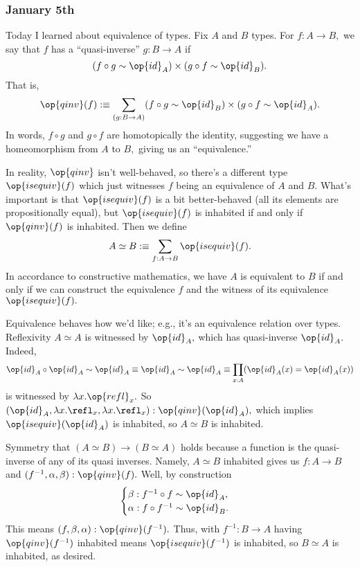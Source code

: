\subsubsection{January 5th}
Today I learned about equivalence of types. Fix $A$ and $B$ types. For $f:A\to B,$ we say that $f$ has a ``quasi-inverse'' $g:B\to A$ if
\[(f\circ g\sim\op{id}_A)\times(g\circ f\sim\op{id}_B).\]
That is,
\[\op{qinv}(f):\equiv\sum_{(g:B\to A)}(f\circ g\sim\op{id}_B)\times(g\circ f\sim\op{id}_A).\]
In words, $f\circ g$ and $g\circ f$ are homotopically the identity, suggesting we have a homeomorphism from $A$ to $B,$ giving us an ``equivalence.''

In reality, $\op{qinv}$ isn't well-behaved, so there's a different type $\op{isequiv}(f)$ which just witnesses $f$ being an equivalence of $A$ and $B.$ What's important is that $\op{isequiv}(f)$ is a bit better-behaved (all its elements are propositionally equal), but $\op{isequiv}(f)$ is inhabited if and only if $\op{qinv}(f)$ is inhabited. Then we define
\[A\simeq B:\equiv\sum_{f:A\to B}\op{isequiv}(f).\]
In accordance to constructive mathematics, we have $A$ is equivalent to $B$ if and only if we can construct the equivalence $f$ and the witness of its equivalence $\op{isequiv}(f).$

Equivalence behaves how we'd like; e.g., it's an equivalence relation over types. Reflexivity $A\simeq A$ is witnessed by $\op{id}_A,$ which has quasi-inverse $\op{id}_A.$ Indeed,
\[\op{id}_A\circ\op{id}_A\sim\op{id}_A\equiv\op{id}_A\sim\op{id}_A\equiv\prod_{x:A}(\op{id}_A(x)=\op{id}_A(x))\]
is witnessed by $\lambda x.\op{refl}_x.$ So $(\op{id}_A,\lambda x.\refl_x,\lambda x.\refl_x):\op{qinv}(\op{id}_A),$ which implies $\op{isequiv}(\op{id}_A)$ is inhabited, so $A\simeq B$ is inhabited.

Symmetry that $(A\simeq B)\to(B\simeq A)$ holds because a function is the quasi-inverse of any of its quasi inverses. Namely, $A\simeq B$ inhabited gives us $f:A\to B$ and $(f^{-1},\alpha,\beta):\op{qinv}(f).$ Well, by construction
\[\begin{cases}
    \beta:f^{-1}\circ f\sim\op{id}_A, \\
    \alpha:f\circ f^{-1}\sim\op{id}_B.
\end{cases}\]
This means $(f,\beta,\alpha):\op{qinv}(f^{-1}).$ Thus, with $f^{-1}:B\to A$ having $\op{qinv}(f^{-1})$ inhabited means $\op{isequiv}(f^{-1})$ is inhabited, so $B\simeq A$ is inhabited, as desired.

